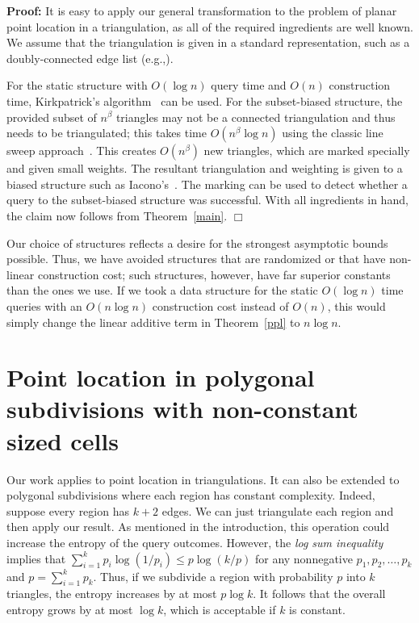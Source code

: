 \documentclass[11pt]{article}
\newenvironment{proof}{\noindent\textbf{Proof: }\ignorespaces}
  {\hspace*{\fill}$\Box$\medskip}
\begin{document}
\begin{proof} 
It is easy to apply our general transformation to the problem of planar
point location in a triangulation, as all of the required ingredients
are well known.  We assume that the triangulation is given in a standard
representation, such as a doubly-connected edge list 
(e.g.,\cite[\S 2.2]{marks}). 

For the static structure with $O(\log n)$ query time and  $O(n)$ 
construction time, Kirkpatrick's algorithm~\cite{kirk} can
be used.  For the subset-biased structure, the provided subset of 
$n^\beta$ triangles may not be a connected triangulation and thus needs to
be triangulated; this takes time $O(n^\beta \log n)$ using the classic 
line sweep approach~\cite{LeePr77}. 
This creates $O(n^\beta)$ new triangles, which are marked specially and given
small weights. 
The resultant triangulation and weighting is given to a biased structure 
such as Iacono's~\cite{Iacono04}. The marking can be used to detect whether
a query to the subset-biased structure was successful. 
With all ingredients in hand, the claim now follows from Theorem~\ref{main}.
\end{proof}

Our choice of structures reflects a desire for the strongest asymptotic
bounds possible. Thus, we have avoided structures that are randomized or
that have non-linear construction cost; such structures, however, have far
superior constants than the ones we use. If we took a data structure for the
static $O(\log n)$ time queries with an $O(n \log n)$
construction cost instead of $O(n)$, this would simply change the linear 
additive term in Theorem~\ref{ppl} to $n \log n$.

\section{Point location in polygonal subdivisions with non-constant sized
cells}
Our work applies to point location in triangulations.
It can also be extended to polygonal subdivisions
where each region has constant complexity. Indeed, suppose
every region has $k+2$ edges. We can just triangulate each region and
then apply our result. As mentioned in the introduction,
this operation could increase the entropy of the query outcomes.
However, the \emph{log sum inequality}~\cite[Theorem~2.7.1]{CoverTh06}
implies that $\sum_{i=1}^{k} p_i \log(1/p_i) \leq p \log (k/p)$
for any nonnegative $p_1, p_2, \dots, p_k$ and $p = \sum_{i=1}^k p_k$.
Thus, if we subdivide a region with probability $p$ into
$k$ triangles, the entropy increases by at most $p \log k$. It
follows that the overall entropy grows by at most $\log k$, which 
is acceptable if $k$ is constant.
\end{document}
